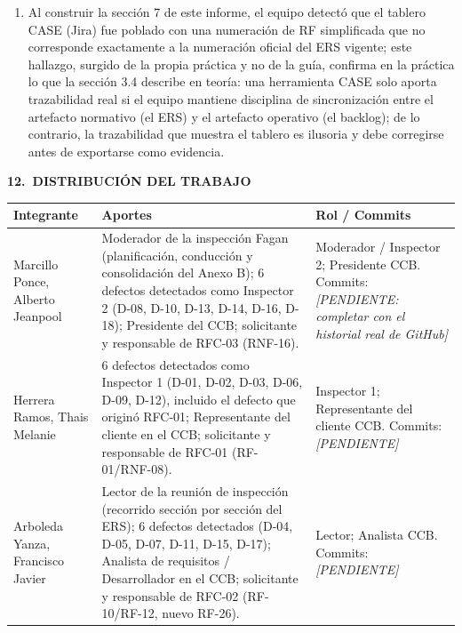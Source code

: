 \documentclass[11pt,a4paper]{article}
\newcommand{\seccion}[2]{%
  \vspace{0.6cm}
  \noindent
  {\color{white}\colorbox{uteqverde}{%
    \parbox[c][1.05cm]{\dimexpr\textwidth-16pt\relax}{%
      \hspace{6pt}\textbf{\large #1\ #2}%
    }%
  }}%
  \vspace{0.35cm}
  \par
}
\begin{document}
\begin{enumerate}
  propia'' son, en este proyecto, el punto más débil de la trazabilidad hacia
  atrás, y deberían ser la prioridad de revisión en la próxima entrega del ERS.
  \item Al construir la sección 7 de este informe, el equipo detectó que el
  tablero CASE (Jira) fue poblado con una numeración de RF simplificada que no
  corresponde exactamente a la numeración oficial del ERS vigente; este
  hallazgo, surgido de la propia práctica y no de la guía, confirma en la
  práctica lo que la sección 3.4 describe en teoría: una herramienta CASE solo
  aporta trazabilidad real si el equipo mantiene disciplina de sincronización
  entre el artefacto normativo (el ERS) y el artefacto operativo (el
  backlog); de lo contrario, la trazabilidad que muestra el tablero es
  ilusoria y debe corregirse antes de exportarse como evidencia.
\end{enumerate}

\seccion{12.}{DISTRIBUCIÓN DEL TRABAJO}

\begin{longtable}{p{3.5cm}p{6.0cm}p{3.0cm}}
\toprule
\textbf{Integrante} & \textbf{Aportes} & \textbf{Rol / Commits} \\
\midrule
\endhead
Marcillo Ponce, Alberto Jeanpool &
Moderador de la inspección Fagan (planificación, conducción y consolidación
del Anexo B); 6 defectos detectados como Inspector 2 (D-08, D-10, D-13, D-14,
D-16, D-18); Presidente del CCB; solicitante y responsable de RFC-03
(RNF-16). &
Moderador / Inspector 2; Presidente CCB. Commits: \textit{[PENDIENTE: completar
con el historial real de GitHub]} \\
\addlinespace
Herrera Ramos, Thais Melanie &
6 defectos detectados como Inspector 1 (D-01, D-02, D-03, D-06, D-09, D-12),
incluido el defecto que originó RFC-01; Representante del cliente en el CCB;
solicitante y responsable de RFC-01 (RF-01/RNF-08). &
Inspector 1; Representante del cliente CCB. Commits: \textit{[PENDIENTE]} \\
\addlinespace
Arboleda Yanza, Francisco Javier &
Lector de la reunión de inspección (recorrido sección por sección del ERS);
6 defectos detectados (D-04, D-05, D-07, D-11, D-15, D-17); Analista de
requisitos / Desarrollador en el CCB; solicitante y responsable de RFC-02
(RF-10/RF-12, nuevo RF-26). &
Lector; Analista CCB. Commits: \textit{[PENDIENTE]} \\
\bottomrule
\end{longtable}
\end{document}
